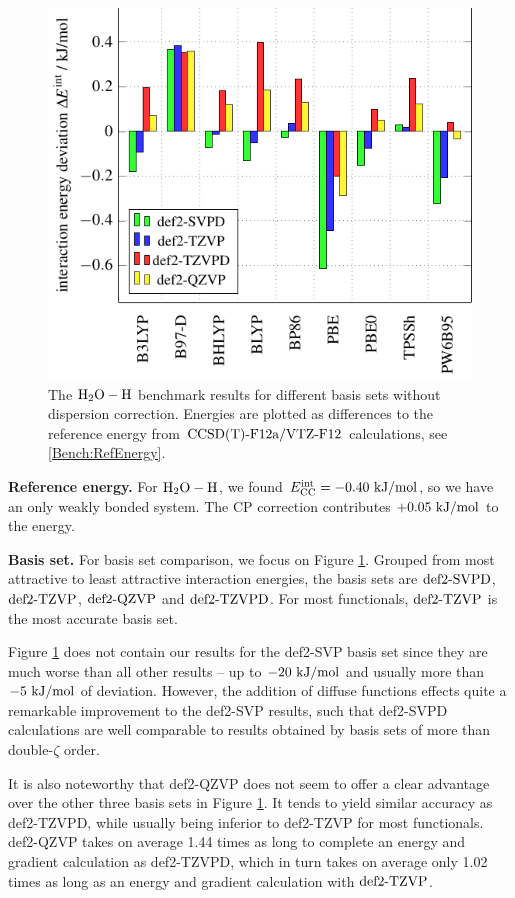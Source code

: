 \begin{figure}[b!]
\includegraphics[width=.7\textwidth]{TikzPics/TikzCreation/Bench/BenchH2O+H.NoD3.pdf}
\caption{The $\mbox{\ensuremath{\text H _2 \text O-\text H}}$ benchmark results for different basis sets without dispersion correction.
Energies are plotted as differences to the reference energy from $\text{CCSD(T)-F12a}/\text{VTZ-F}12$ calculations,
see \eqref{Bench:RefEnergy}.}
\label{Fig:Bench:H2O+H:NoD3}
\end{figure}

\textbf{Reference energy.} For $\mbox{\ensuremath{\text H _2 \text O-\text H}}$, we found \mbox{$E^{\text{int}}_{\text {CC}}=-0.40\ \text {kJ/mol}$}, so
we have an only weakly bonded system. The CP correction contributes $+0.05\ \text {kJ/mol}$ to
the energy.

\textbf{Basis set.} For basis set comparison, we focus on Figure
\ref{Fig:Bench:H2O+H:NoD3}. Grouped from most attractive to least attractive
interaction energies, the basis sets are $\text{def2-SVPD}$, $\text{def2-TZVP}$, $\text{def2-QZVP}$ and $\text{def2-TZVPD}$.
For most functionals, $\text{def2-TZVP}$ is the most accurate basis set.

Figure \ref{Fig:Bench:H2O+H:NoD3} does not contain our results for the def2-SVP basis
set since they are much worse than all other results -- up to $-20\ \text {kJ/mol}$ and
usually more than $-5\ \text {kJ/mol}$ of deviation. However, the addition of diffuse
functions effects quite a remarkable improvement to the def2-SVP results, such
that def2-SVPD calculations are well comparable to results obtained by basis
sets of more than double-$\zeta$ order.

It is also noteworthy that def2-QZVP does not seem to offer a clear advantage over the
other three basis sets in Figure \ref{Fig:Bench:H2O+H:NoD3}. It tends to yield
similar accuracy as def2-TZVPD, while usually being inferior to def2-TZVP for
most functionals. def2-QZVP takes on average 1.44 times as long to complete an
energy and gradient calculation as def2-TZVPD, which in turn takes
on average only 1.02 times as long as an energy and gradient calculation with
$\text{def2-TZVP}$.

